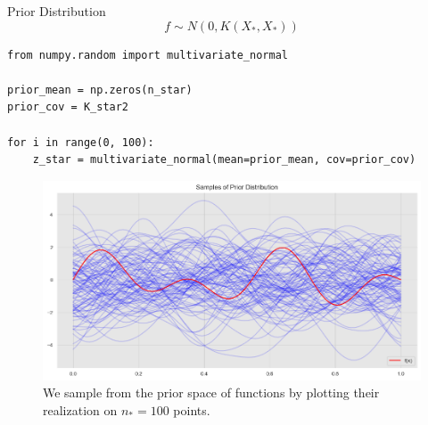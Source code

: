 \documentclass[10pt]{beamer}
\begin{document}
\begin{frame}[fragile]{Prior Distribution}
$$
f \sim N(0, K(X_*,X_*))
$$
\begin{lstlisting}
from numpy.random import multivariate_normal

prior_mean = np.zeros(n_star)
prior_cov = K_star2

for i in range(0, 100):
    z_star = multivariate_normal(mean=prior_mean, cov=prior_cov)
\end{lstlisting}
\begin{center}
\begin{figure}
\includegraphics[scale=0.3]{images/gaussian_process_regression_files/gaussian_process_regression_48_0.png} 
\caption{We sample from the prior space of functions by plotting their realization on $n_*=100$ points. }
\end{figure}
\end{center}
\end{frame}
\end{document}
